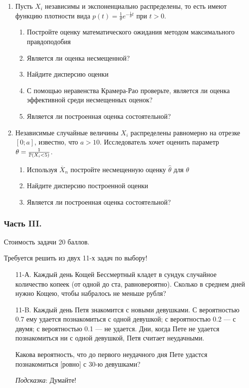 \begin{enumerate}
\item Пусть $X_{i}$ независимы и экспоненциально
распределены, то есть имеют функцию плотности вида
$p(t)=\frac{1}{\theta}e^{-\frac{1}{\theta}t}$ при $t>0$.
\begin{enumerate}
\item Постройте оценку математического ожидания методом максимального
правдоподобия
\item Является ли оценка несмещенной?
\item Найдите дисперсию оценки
\item С помощью неравенства Крамера-Рао проверьте, является ли
оценка эффективной среди несмещенных оценок?
\item Является ли построенная оценка состоятельной?
\end{enumerate}


\item Независимые случайные величины $X_{i}$ распределены
равномерно на отрезке $[0;a]$, известно, что $a>10$. Исследователь
хочет оценить
параметр $\theta=\frac{1}{\P(X_{i}<5)}$.
\begin{enumerate}
\item Используя $\overline{X}_{n}$ постройте несмещенную оценку
$\hat{\theta}$ для $\theta$
\item Найдите дисперсию построенной оценки
\item Является ли построенная оценка состоятельной?
\end{enumerate}
\end{enumerate}

\subsubsection*{Часть III.}

Стоимость задачи 20 баллов.

Требуется решить \textbf{} из двух 11-х задач по
выбору!

\begin{enumerate}
\item[11-А.] Каждый день Кощей Бессмертный кладет в сундук случайное количество
копеек (от одной до ста, равновероятно). Сколько в среднем дней нужно Кощею, чтобы набралось не меньше рубля?

\item[11-B.] Каждый день Петя знакомится с новыми девушками. С вероятностью 0.7
ему удается познакомиться с одной девушкой; с вероятностью 0.2 — с
двумя; с вероятностью 0.1 — не удается. Дни, когда Пете не удается
познакомиться ни с одной девушкой, Петя считает неудачными.

Какова вероятность, что до первого неудачного дня Пете удастся
познакомиться $[$ровно$]$ с 30-ю девушками?

\emph{Подсказка}: Думайте!
\end{enumerate}

